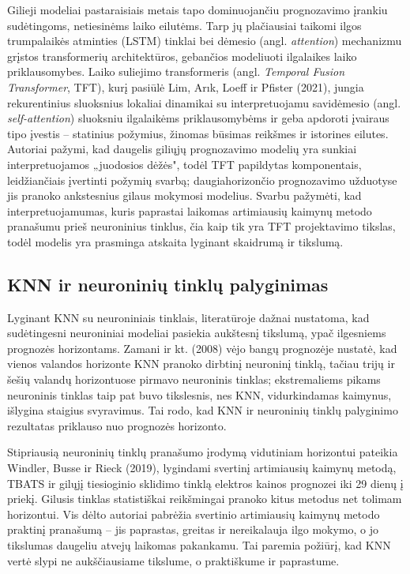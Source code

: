 \documentclass[]{VUMIFTemplateClass}
\begin{document}
    Gilieji modeliai pastaraisiais metais tapo dominuojančiu prognozavimo įrankiu sudėtingoms, netiesinėms laiko eilutėms. Tarp jų plačiausiai taikomi ilgos trumpalaikės atminties (LSTM) tinklai bei dėmesio (angl. \textit{attention}) mechanizmu grįstos transformerių architektūros, gebančios modeliuoti ilgalaikes laiko priklausomybes. Laiko suliejimo transformeris (angl. \textit{Temporal Fusion Transformer}, TFT), kurį pasiūlė Lim, Arık, Loeff ir Pfister (2021), jungia rekurentinius sluoksnius lokaliai dinamikai su interpretuojamu savidėmesio (angl. \textit{self-attention}) sluoksniu ilgalaikėms priklausomybėms ir geba apdoroti įvairaus tipo įvestis -- statinius požymius, žinomas būsimas reikšmes ir istorines eilutes. Autoriai pažymi, kad daugelis giliųjų prognozavimo modelių yra sunkiai interpretuojamos „juodosios dėžės", todėl TFT papildytas komponentais, leidžiančiais įvertinti požymių svarbą; daugiahorizončio prognozavimo užduotyse jis pranoko ankstesnius gilaus mokymosi modelius. Svarbu pažymėti, kad interpretuojamumas, kuris paprastai laikomas artimiausių kaimynų metodo pranašumu prieš neuroninius tinklus, čia kaip tik yra TFT projektavimo tikslas, todėl modelis yra prasminga atskaita lyginant skaidrumą ir tikslumą.

    \subsection{KNN ir neuroninių tinklų palyginimas}

    Lyginant KNN su neuroniniais tinklais, literatūroje dažnai nustatoma, kad sudėtingesni neuroniniai modeliai pasiekia aukštesnį tikslumą, ypač ilgesniems prognozės horizontams. Zamani ir kt. (2008) vėjo bangų prognozėje nustatė, kad vienos valandos horizonte KNN pranoko dirbtinį neuroninį tinklą, tačiau trijų ir šešių valandų horizontuose pirmavo neuroninis tinklas; ekstremaliems pikams neuroninis tinklas taip pat buvo tikslesnis, nes KNN, vidurkindamas kaimynus, išlygina staigius svyravimus. Tai rodo, kad KNN ir neuroninių tinklų palyginimo rezultatas priklauso nuo prognozės horizonto.

    Stipriausią neuroninių tinklų pranašumo įrodymą vidutiniam horizontui pateikia Windler, Busse ir Rieck (2019), lygindami svertinį artimiausių kaimynų metodą, TBATS ir gilųjį tiesioginio sklidimo tinklą elektros kainos prognozei iki 29 dienų į priekį. Gilusis tinklas statistiškai reikšmingai pranoko kitus metodus net tolimam horizontui. Vis dėlto autoriai pabrėžia svertinio artimiausių kaimynų metodo praktinį pranašumą -- jis paprastas, greitas ir nereikalauja ilgo mokymo, o jo tikslumas daugeliu atvejų laikomas pakankamu. Tai paremia požiūrį, kad KNN vertė slypi ne aukščiausiame tikslume, o praktiškume ir paprastume.
\end{document}
